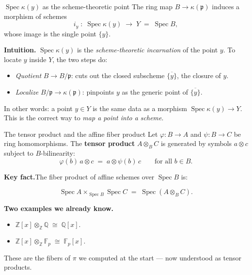 \documentclass[aspectratio=169,12pt]{beamer}
\newenvironment{mathbox}{%
  \begin{tcolorbox}[mathbox]}{%
  \end{tcolorbox}}
\begin{document}
\begin{frame}{$\operatorname{Spec}\kappa(y)$ as the scheme-theoretic point}
  The ring map $B \to \kappa(\mathfrak{p})$ induces a morphism of schemes
  \[
    i_y \;:\; \operatorname{Spec}\kappa(y) \;\longrightarrow\; Y
      \;=\; \operatorname{Spec} B,
  \]
  whose image is the single point $\{y\}$.

  \medskip

  \textbf{Intuition.}\enspace
  $\operatorname{Spec}\kappa(y)$ is the \emph{scheme-theoretic incarnation}
  of the point $y$. To locate $y$ inside $Y$, the two steps do:
  \begin{itemize}
    \item \emph{Quotient} $B \to B/\mathfrak{p}$: cuts out the closed subscheme
          $\overline{\{y\}}$, the closure of $y$.
    \item \emph{Localize} $B/\mathfrak{p} \to \kappa(\mathfrak{p})$:
          pinpoints $y$ as the generic point of $\overline{\{y\}}$.
  \end{itemize}

  \medskip

  In other words: a point $y \in Y$ is the same data as a morphism
  $\operatorname{Spec}\kappa(y) \to Y$.
  This is the correct way to \emph{map a point into a scheme}.
\end{frame}

\begin{frame}{The tensor product and the affine fiber product}
  Let $\varphi: B \to A$ and $\psi: B \to C$ be ring homomorphisms.
  The \textbf{tensor product} $A \otimes_B C$ is generated by symbols
  $a \otimes c$ subject to $B$-bilinearity:
  \[
    \varphi(b)\,a \otimes c \;=\; a \otimes \psi(b)\,c
    \qquad \text{for all } b \in B.
  \]

  \medskip

  \textbf{Key fact.}\enspace The fiber product of affine schemes over
  $\operatorname{Spec} B$ is:
  \begin{mathbox}
  \[
    \operatorname{Spec} A \times_{\operatorname{Spec} B} \operatorname{Spec} C
    \;=\; \operatorname{Spec}(A \otimes_B C).
  \]
  \end{mathbox}

  \medskip

  \textbf{Two examples we already know.}
  \begin{itemize}
    \item $\mathbb{Z}[x] \otimes_{\mathbb{Z}} \mathbb{Q}
          \;\cong\; \mathbb{Q}[x]$.
    \item $\mathbb{Z}[x] \otimes_{\mathbb{Z}} \mathbb{F}_p
          \;\cong\; \mathbb{F}_p[x]$.
  \end{itemize}
  These are the fibers of $\pi$ we computed at the start — now understood
  as tensor products.
\end{frame}
\end{document}
